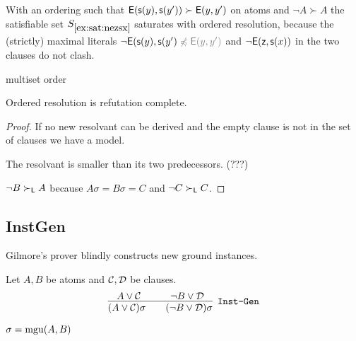 \begin{example}
	With an ordering such that ${\mathsf{E}}({\mathsf s}(y),{\mathsf s}(y')) \succ {\mathsf{E}}(y,y')$ on atoms and ${\lnot A} \succ A$
	the satisfiable set $S_{\ref{ex:sat:nezsx}}$ saturates with ordered resolution,
	because the (strictly) maximal literals 
	$\lnot \mE(\msucc(y),\msucc(y') \colG\not\preccurlyeq \mE(y,y') $
	and $\lnot{\mathsf{E}}({\mathsf z},{\mathsf s}(x))$
	in the two clauses do not clash.
\end{example}


\begin{definition}
	multiset order
\end{definition}

\begin{lemma}
	Ordered resolution is refutation complete.
\end{lemma}

\begin{proof}
	If no new resolvant can be derived and the empty clause is not in the set of clauses we have a model.
	
	The resolvant is smaller than its two predecessors. (???)
	
	$\lnot B \succ_{\mathsf L} A$ because $A\sigma=B\sigma=C$ and $\lnot C\succ_{\mathsf L} C$.
\end{proof}








\subsection{InstGen}

Gilmore's prover blindly constructs new ground instances. 

\begin{definition}[\InstGen] Let $A, B$ be atoms and ${\mathcal C},{\mathcal D}$ be clauses.
	\begin{gather*}
	\infer
	[{\InstGen}] 
	{(A\lor\mathcal C)\sigma\qquad (\lnot B\lor\mathcal D)\sigma}
	{A\lor\mathcal C\quad&\quad \lnot B\lor\mathcal D}
	\end{gather*}
	\begin{center}$\sigma=\operatorname{mgu}(A,B)$
	\end{center}
\end{definition}

